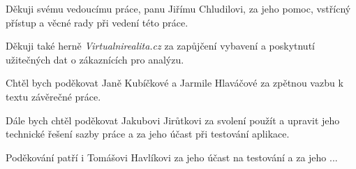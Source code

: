 Děkuji svému vedoucímu práce, panu Jiřímu Chludilovi, za jeho pomoc, vstřícný přístup a věcné rady při vedení této práce.

Děkuji také herně \emph{Virtualnirealita.cz} za zapůjčení vybavení a poskytnutí užitečných dat o zákaznících pro analýzu.

Chtěl bych poděkovat Janě Kubíčkové a Jarmile Hlaváčové za zpětnou vazbu k textu závěrečné práce.

Dále bych chtěl poděkovat Jakubovi Jirůtkovi za svolení použít a upravit jeho technické řešení sazby práce a za jeho účast při testování aplikace.

Poděkování patří i Tomášovi Havlíkovi za jeho účast na testování a za jeho ...